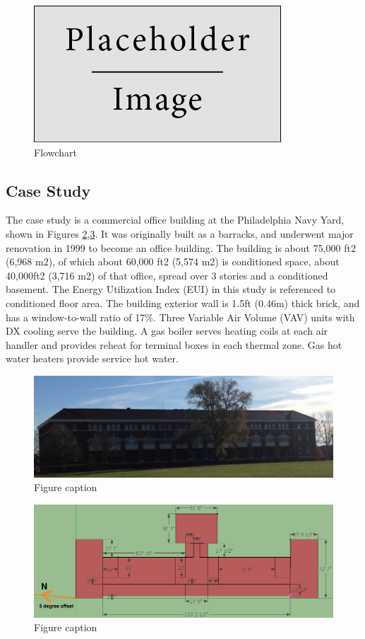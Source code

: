 \documentclass[review]{elsarticle}
\begin{document}
\begin{figure}[h]
	\centering\includegraphics[width=0.4\linewidth]{placeholder.jpg}
	\caption{Flowchart}
	\label{flowchart}
\end{figure}

\subsection{Case Study}
The case study is a commercial office building at the Philadelphia Navy Yard, shown in Figures \ref{Bldg101a},\ref{Bldg101b}. It was originally built as a barracks, and underwent major renovation in 1999 to become an office building. The building is about 75,000 ft2 (6,968 m2), of which about 60,000 ft2 (5,574 m2) is conditioned space, about 40,000ft2 (3,716 m2) of that office, spread over 3 stories and a conditioned basement. The Energy Utilization Index (EUI) in this study is referenced to conditioned floor area.  The building exterior wall is 1.5ft (0.46m) thick brick, and has a window-to-wall ratio of 17\%.  Three Variable Air Volume (VAV) units with DX cooling serve the building. A gas boiler serves heating coils at each air handler and provides reheat for terminal boxes in each thermal zone. Gas hot water heaters provide service hot water.\par
\begin{figure}[h]
	\centering\includegraphics[width=0.4\linewidth]{Bldg101photo.jpg}
	\caption{Figure caption}
	\label{Bldg101a}
\end{figure}
\begin{figure}[h]
	\centering\includegraphics[width=0.4\linewidth]{Bldg101layout.png}
	\caption{Figure caption}
	\label{Bldg101b}
\end{figure}
\end{document}
